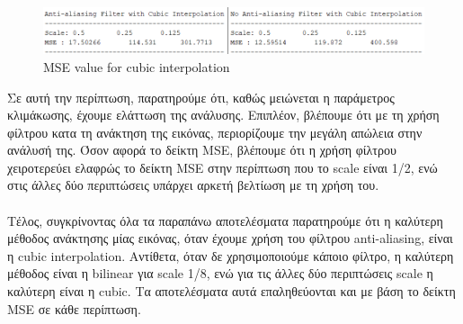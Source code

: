\documentclass{article}
\begin{document}
\begin{figure}[h!]
	\centering
	\includegraphics[width=\linewidth]{./output_images/MSE_cubic.png}
	\caption{MSE value for cubic interpolation}
\end{figure}
	\noindent
	Σε αυτή την περίπτωση, παρατηρούμε ότι, καθώς μειώνεται η παράμετρος κλιμάκωσης, έχουμε ελάττωση της ανάλυσης. Επιπλέον, βλέπουμε ότι με τη χρήση φίλτρου κατα τη ανάκτηση της εικόνας, περιορίζουμε την μεγάλη απώλεια στην ανάλυσή της. Όσον αφορά το δείκτη MSE, βλέπουμε ότι η χρήση φίλτρου χειροτερεύει ελαφρώς το δείκτη MSE στην περίπτωση που το scale είναι 1/2, ενώ στις άλλες δύο περιπτώσεις υπάρχει αρκετή βελτίωση με τη χρήση του. \\
	\\
	\noindent
	Τέλος, συγκρίνοντας όλα τα παραπάνω αποτελέσματα παρατηρούμε ότι η καλύτερη μέθοδος ανάκτησης μίας εικόνας, όταν έχουμε χρήση του φίλτρου anti-aliasing, είναι η cubic interpolation. Αντίθετα, όταν δε χρησιμοποιούμε κάποιο φίλτρο, η καλύτερη μέθοδος είναι η bilinear για scale 1/8, ενώ για τις άλλες δύο περιπτώσεις scale η καλύτερη είναι η cubic. Tα αποτελέσματα αυτά επαληθεύονται και με βάση το δείκτη MSE σε κάθε περίπτωση. 
\end{document}
